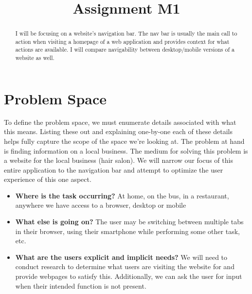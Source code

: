 

\title{Assignment M1\\}



\maketitle
\thispagestyle{fancy}

% 

\begin{abstract}
I will be focusing on a website’s navigation bar. The nav bar is usually the main call to action when visiting a homepage of a web application and provides context for what actions are available. I will compare navigability between desktop/mobile versions of a website as well.
\end{abstract}

\section{Problem Space}
To define the problem space, we must enumerate details associated with what this means. Listing these out and explaining one-by-one each of these details helps fully capture the scope of the space we're looking at. The problem at hand is finding information on a local business. The medium for solving this problem is a website for the local business (hair salon). We will narrow our focus of this entire application to the navigation bar and attempt to optimize the user experience of this one aspect.

\begin{itemize}
\item
  \textbf{Where is the task occurring?} At home, on the bus, in a restaurant, anywhere we have access to a browser, desktop or mobile
\item
  \textbf{What else is going on?} The user may be switching between multiple tabs in their browser, using their smartphone while performing some other task, etc.
\item
  \textbf{What are the users explicit and implicit needs?} We will need to conduct research to determine what users are visiting the website for and provide webpages to satisfy this. Additionally, we can ask the user for input when their intended function is not present.
\end{itemize}

